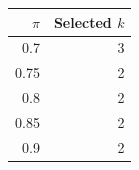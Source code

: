 \begin{tabular}{rr}
\toprule
$\pi$ & Selected $k$ \\
\midrule
0.7 & 3 \\
0.75 & 2 \\
0.8 & 2 \\
0.85 & 2 \\
0.9 & 2 \\
\bottomrule
\end{tabular}

